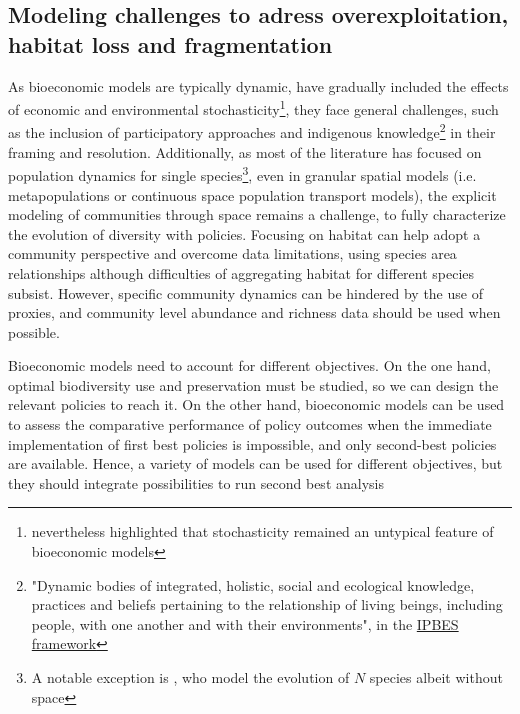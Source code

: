 \clearpage
{}
{}
\subsection*{Modeling challenges to adress overexploitation, habitat loss and fragmentation}


As bioeconomic models are typically dynamic, have gradually included the effects of economic and environmental stochasticity\footnote{\cite{Drechsler20200} nevertheless highlighted that stochasticity remained an untypical feature of bioeconomic models}, they face general challenges, such as the inclusion of participatory approaches and indigenous knowledge\footnote{"Dynamic bodies of integrated, holistic, social and ecological knowledge, practices and beliefs pertaining to the relationship of living beings, including people, with one another and with their environments", in the \href{https://www.ipbes.net/glossary-tag/indigenous-and-local-knowledge}{IPBES framework}} in their framing and resolution. Additionally, as most of the literature has focused on population dynamics for single species\footnote{A notable exception is \cite{brock_optimal_2002}, who model the evolution of $N$ species albeit without space}, even in granular spatial models \citep{sanchirico_bioeconomics_1999, SANCHIRICO200523, costello_optimal_2008,brock_pattern_2010, Sanchirico2010, albers_invasive_2010, costello_private_2017} (i.e. metapopulations or continuous space population transport models), the explicit modeling of communities through space remains a challenge, to fully characterize the evolution of diversity with policies. Focusing on habitat can help adopt a community perspective and overcome data limitations, using species area relationships \citep{macarthur_theory_1967} although difficulties of aggregating habitat for different species subsist. However, specific community dynamics can be hindered by the use of proxies, and community level abundance and richness data should be used when possible. 
 
Bioeconomic models need to account for different objectives. On the one hand, optimal biodiversity use and preservation must be studied, so we can design the relevant policies to reach it. On the other hand, bioeconomic models can be used to assess the comparative performance of policy outcomes when the immediate implementation of first best policies is impossible, and only second-best policies are available. Hence, a variety of models can be used for different objectives, but they should integrate possibilities to run second best analysis \citep{lipsey_lancaster_1956} 

